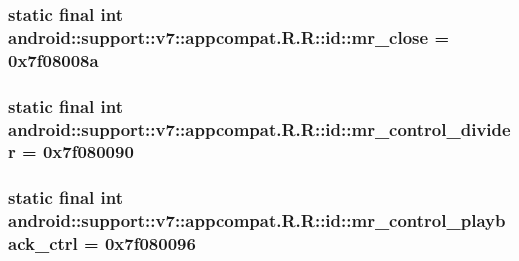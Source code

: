 \hypertarget{classandroid_1_1support_1_1v7_1_1appcompat_1_1_r_1_1id_6d7a7cec3162764e61ab0f162c417863}{
\subsubsection[{mr\_\-close}]{\setlength{\rightskip}{0pt plus 5cm}static final int android::support::v7::appcompat.R.R::id::mr\_\-close = 0x7f08008a}}
\label{classandroid_1_1support_1_1v7_1_1appcompat_1_1_r_1_1id_6d7a7cec3162764e61ab0f162c417863}


\hypertarget{classandroid_1_1support_1_1v7_1_1appcompat_1_1_r_1_1id_af8bd78cf520541a19d426858b66e33b}{
\subsubsection[{mr\_\-control\_\-divider}]{\setlength{\rightskip}{0pt plus 5cm}static final int android::support::v7::appcompat.R.R::id::mr\_\-control\_\-divider = 0x7f080090}}
\label{classandroid_1_1support_1_1v7_1_1appcompat_1_1_r_1_1id_af8bd78cf520541a19d426858b66e33b}


\hypertarget{classandroid_1_1support_1_1v7_1_1appcompat_1_1_r_1_1id_571e481d6d4bfb6a59c4612e3e8aabad}{
\subsubsection[{mr\_\-control\_\-playback\_\-ctrl}]{\setlength{\rightskip}{0pt plus 5cm}static final int android::support::v7::appcompat.R.R::id::mr\_\-control\_\-playback\_\-ctrl = 0x7f080096}}
\label{classandroid_1_1support_1_1v7_1_1appcompat_1_1_r_1_1id_571e481d6d4bfb6a59c4612e3e8aabad}


